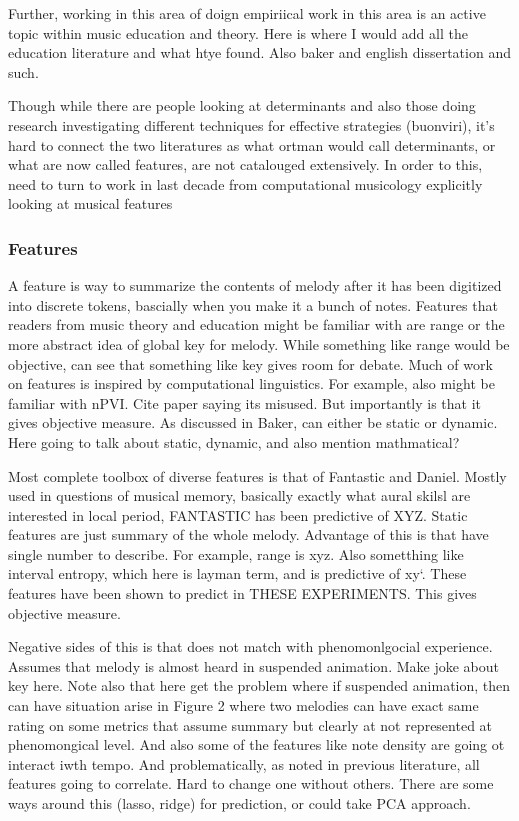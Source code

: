 \documentclass[english,man,floatsintext]{apa6}
\begin{document}
Further, working in this area of doign empiriical work in this area is an active topic within music education and theory.
Here is where I would add all the education literature and what htye found.
Also baker and english dissertation and such.

Though while there are people looking at determinants and also those doing research investigating different techniques for effective strategies (buonviri), it's hard to connect the two literatures as what ortman would call determinants, or what are now called features, are not catalouged extensively.
In order to this, need to turn to work in last decade from computational musicology explicitly looking at musical features

\hypertarget{features}{%
\subsubsection{Features}\label{features}}

A feature is way to summarize the contents of melody after it has been digitized into discrete tokens, bascially when you make it a bunch of notes.
Features that readers from music theory and education might be familiar with are range or the more abstract idea of global key for melody.
While something like range would be objective, can see that something like key gives room for debate.
Much of work on features is inspired by computational linguistics.
For example, also might be familiar with nPVI.
Cite paper saying its misused.
But importantly is that it gives objective measure.
As discussed in Baker, can either be static or dynamic.
Here going to talk about static, dynamic, and also mention mathmatical?

Most complete toolbox of diverse features is that of Fantastic and Daniel.
Mostly used in questions of musical memory, basically exactly what aural skilsl are interested in local period, FANTASTIC has been predictive of XYZ.
Static features are just summary of the whole melody.
Advantage of this is that have single number to describe.
For example, range is xyz.
Also sometthing like interval entropy, which here is layman term, and is predictive of xy`.
These features have been shown to predict in THESE EXPERIMENTS.
This gives objective measure.

Negative sides of this is that does not match with phenomonlgocial experience.
Assumes that melody is almost heard in suspended animation.
Make joke about key here.
Note also that here get the problem where if suspended animation, then can have situation arise in Figure 2 where two melodies can have exact same rating on some metrics that assume summary but clearly at not represented at phenomongical level.
And also some of the features like note density are going ot interact iwth tempo.
And problematically, as noted in previous literature, all features going to correlate.
Hard to change one without others.
There are some ways around this (lasso, ridge) for prediction, or could take PCA approach.
\end{document}
